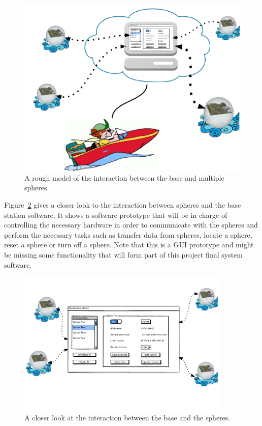 \begin{figure}[H]
	\centering
	\includegraphics[scale=0.6]{img/GSV2}
	\caption{A rough model of the interaction between the base and multiple spheres. \label{fig:GSV2}}
\end{figure}

Figure~\ref{fig:GSV3} gives a closer look to the interaction between spheres and the base station software.  It shows a software prototype that will be in charge of controlling the necessary hardware in order to communicate with the spheres and perform the necessary tasks such as transfer data from spheres, locate a sphere, reset a sphere or turn off a sphere.  Note that this is a GUI prototype and might be missing some functionality that will form part of this project final system software.  

\begin{figure}[H]
	\centering
	\includegraphics[width=0.9\textwidth]{img/GSV3}
	\caption{A closer look at the interaction between the base and the spheres. \label{fig:GSV3}}
\end{figure}

